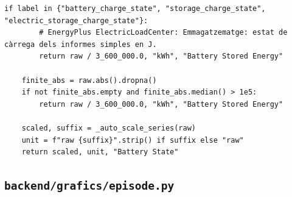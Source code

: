 \documentclass[10pt,a4paper]{article}
\begin{document}
\begin{lstlisting}[style=studioPython,caption={backend/grafics/energy\_units.py},label={lst:backend-grafics-energy-units-py}]
    if label in {"battery_charge_state", "storage_charge_state", "electric_storage_charge_state"}:
        # EnergyPlus ElectricLoadCenter: Emmagatzematge: estat de càrrega dels informes simples en J.
        return raw / 3_600_000.0, "kWh", "Battery Stored Energy"

    finite_abs = raw.abs().dropna()
    if not finite_abs.empty and finite_abs.median() > 1e5:
        return raw / 3_600_000.0, "kWh", "Battery Stored Energy"

    scaled, suffix = _auto_scale_series(raw)
    unit = f"raw {suffix}".strip() if suffix else "raw"
    return scaled, unit, "Battery State"
\end{lstlisting}


\subsection{\texorpdfstring{\texttt{backend/grafics/episode.py}}{backend/grafics/episode.py}}
\end{document}
